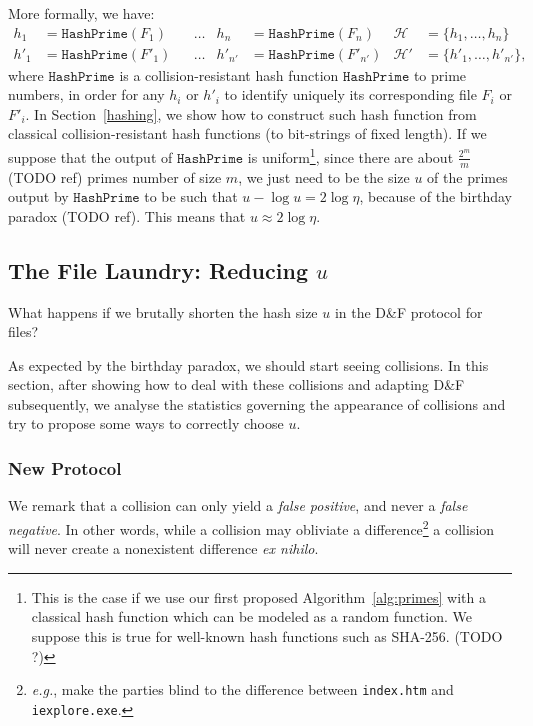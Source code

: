 \documentclass[11pt]{llncs}
\newcommand{\Set}{\mathcal{H}}
\newcommand{\df}{D\&F\xspace}
\newcommand{\eg}{\textit{e.g.}\xspace}
\newcommand{\HashPrime}{\ensuremath{\mathtt{HashPrime}}}
\begin{document}
More formally, we have:
\begin{align*}
h_1 &= \HashPrime(F_1) & &\dots & h_n &= \HashPrime(F_n) & \Set &= \{h_1,\dots,h_n\} \\
h'_1 &= \HashPrime(F'_1) & &\dots & h'_{n'} &= \HashPrime(F'_{n'}) & \Set' &= \{h'_1,\dots,h'_{n'}\},
\end{align*}
where $\HashPrime$ is a collision-resistant hash function $\HashPrime$ to prime numbers, in order for any $h_i$ or $h'_i$ to identify uniquely its corresponding file $F_i$ or $F'_i$.
In Section~\ref{hashing}, we show how to construct such hash function from classical collision-resistant hash functions (to bit-strings of fixed length).
If we suppose that the output of $\HashPrime$ is uniform\footnote{This is the case if we use our first proposed Algorithm~\ref{alg:primes} with a classical hash function which can be modeled as a random function.
We suppose this is true for well-known hash functions such as SHA-256. (TODO ?)}, since there are about $\frac{2^m}{m}$ (TODO ref) primes number of size $m$, we just need to be the size $u$ of the primes output by $\HashPrime$ to be such that $u - \log u = 2 \log \eta$, because of the birthday paradox (TODO ref).
This means that $u \approx 2\log \eta$.
\subsection{The File Laundry: Reducing $u$}
\label{shortu}
What happens if we brutally shorten the hash size $u$ in the \df protocol for files?

As expected by the birthday paradox, we should start seeing collisions. 
In this section, after showing how to deal with these collisions and adapting \df subsequently, we analyse the statistics governing the appearance of collisions and try to propose some ways to correctly choose $u$.

\subsubsection{New Protocol}

We remark that a collision can only yield a \textit{false positive}, and never a \textit{false negative}. In other words, while a collision may obliviate a difference\footnote{\eg, make the parties blind to the difference between {\tt index.htm} and {\tt iexplore.exe}.} a collision will never create a nonexistent difference \textit{ex nihilo}.
\end{document}
